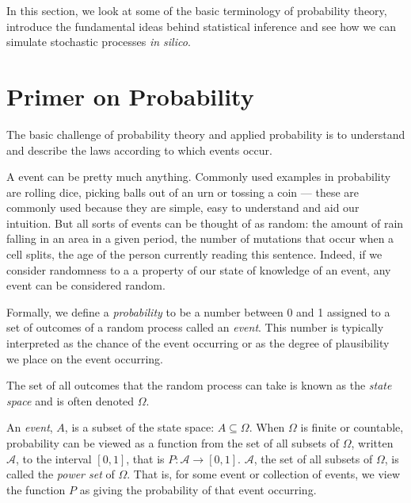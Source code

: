 \documentclass[11pt]{article}
\begin{document}
In this section, we look at some of the basic terminology of probability theory,  introduce the fundamental ideas behind statistical inference and see how we can simulate stochastic processes {\em in silico}.


\section{Primer on Probability}

The basic challenge of probability theory and applied probability is to understand and describe the laws according to which events occur.  

A event can be pretty much anything.  Commonly used examples in probability are rolling dice, picking balls out of an urn or tossing a coin --- these are commonly used because they are simple, easy to understand and aid our intuition. But all sorts of events can be thought of as random: the amount of rain falling in an area in a given period, the number of mutations that occur when a cell splits, the age of the person currently reading this sentence.   Indeed, if we consider randomness to a a property of our state of knowledge of an event, any event can be considered random.



Formally, we define a {\em probability} to be a  number between 0 and 1 assigned to a set of outcomes of a random process called an {\em event}.  This number is typically  interpreted as the chance of the event occurring or as the degree of plausibility we place on the event occurring. 





The set of all outcomes that the random process can take is known as the {\em state space} and is often denoted $\Omega$.

An {\em event}, $A$, is a subset of the state space: $A\subseteq\Omega$.  When $\Omega$ is finite or countable, probability can be viewed as a function from the set of all subsets of $\Omega$, written $\mathcal A$, to the interval $[0,1]$, that is  $P:\mathcal A \rightarrow [0,1]$.  $\mathcal A$, the set of all subsets of $\Omega$, is called the {\em power set} of $\Omega$. 
That is, for some event or collection of events, we view the function $P$ as giving the probability of that event occurring.
 
\end{document}
